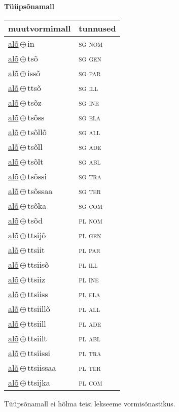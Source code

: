 

\vspace{3.5em}
\noindent \begin{minipage}{\textwidth}
\noindent \textbf{Tüüpsõnamall \,}\\

\begin{sideways}
\begin{tabular}{l l}
muutvormimall & tunnused \\
\hline
\underline{alõ}\,$\oplus$\,in & \textsc{ sg nom } \\
\underline{alõ}\,$\oplus$\,tsõ & \textsc{ sg gen } \\
\underline{alõ}\,$\oplus$\,issõ & \textsc{ sg par } \\
\underline{alõ}\,$\oplus$\,ttsõ & \textsc{ sg ill } \\
\underline{alõ}\,$\oplus$\,tsõz & \textsc{ sg ine } \\
\underline{alõ}\,$\oplus$\,tsõss & \textsc{ sg ela } \\
\underline{alõ}\,$\oplus$\,tsõllõ & \textsc{ sg all } \\
\underline{alõ}\,$\oplus$\,tsõll & \textsc{ sg ade } \\
\underline{alõ}\,$\oplus$\,tsõlt & \textsc{ sg abl } \\
\underline{alõ}\,$\oplus$\,tsõssi & \textsc{ sg tra } \\
\underline{alõ}\,$\oplus$\,tsõssaa & \textsc{ sg ter } \\
\underline{alõ}\,$\oplus$\,tsõka & \textsc{ sg com } \\
\underline{alõ}\,$\oplus$\,tsõd & \textsc{ pl nom } \\
\underline{alõ}\,$\oplus$\,ttsijõ & \textsc{ pl gen } \\
\underline{alõ}\,$\oplus$\,ttsiit & \textsc{ pl par } \\
\underline{alõ}\,$\oplus$\,ttsiisõ & \textsc{ pl ill } \\
\underline{alõ}\,$\oplus$\,ttsiiz & \textsc{ pl ine } \\
\underline{alõ}\,$\oplus$\,ttsiiss & \textsc{ pl ela } \\
\underline{alõ}\,$\oplus$\,ttsiillõ & \textsc{ pl all } \\
\underline{alõ}\,$\oplus$\,ttsiill & \textsc{ pl ade } \\
\underline{alõ}\,$\oplus$\,ttsiilt & \textsc{ pl abl } \\
\underline{alõ}\,$\oplus$\,ttsiissi & \textsc{ pl tra } \\
\underline{alõ}\,$\oplus$\,ttsiissaa & \textsc{ pl ter } \\
\underline{alõ}\,$\oplus$\,ttsijka & \textsc{ pl com } \\
\end{tabular}
\end{sideways}
\label{tab:tüüpsõnamall-alõin}

\end{minipage}

 
\vspace{1em}
\noindent Tüüpsõnamall  ei hõlma teisi lekseeme vormi\-sõnastikus.
